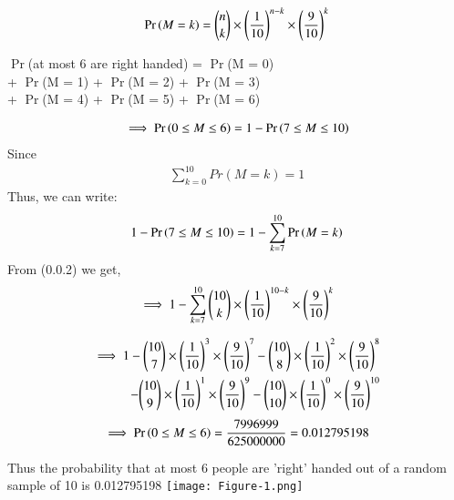 \documentclass[journal,12pt,twocolumn]{IEEEtran}
\begin{document}
\begin{align}
\Pr\left(M=k\right) = {{n}\choose{k}} \times \left(\frac{1}{10}\right)^{n-k} \times \left(\frac{9}{10}\right)^{k}\label{0.0.2}
\end{align}
\begin{center}
$\Pr$(at most 6 are right handed) = $\Pr$(M = 0)\\+ $\Pr$(M = 1) + $\Pr$(M = 2) + $\Pr$(M = 3) \\+ $\Pr$(M = 4) + $\Pr$(M = 5) + $\Pr$(M = 6)\\ 
\end{center}
\begin{align}
\implies \Pr\left(0\leq M \leq 6\right) = 1 - \Pr\left(7 \leq M \leq10\right)\label{0.0.3}
\end{align}
Since
\begin{align}
\sum_{k=0}^{10} Pr(M=k) = 1\label{0.0.4}
\end{align}
\bigskip
Thus, we can write:
\begin{align}
1 - \Pr\left(7 \leq M \leq 10\right) = 1 - \sum_{k=7}^{10} \Pr\left(M=k\right)\label{0.0.5}
\end{align}
From (0.0.2) we get,
\begin{align}
\implies 1 - \sum_{k=7}^{10} {{10}\choose{k}} \times \left(\frac{1}{10}\right)^{10-k} \times \left(\frac{9}{10}\right)^{k}\label{0.0.6}
\end{align}

\begin{align}
\begin{split}
\implies 1 - {{10}\choose{7}} \times \brak{\frac{1}{10}}^{3} \times \brak{\frac{9}{10}}^{7} - {{10}\choose{8}} \times \brak{\frac{1}{10}}^{2} \times \brak{\frac{9}{10}}^{8}
\bigskip\\
-{{10}\choose{9}} \times \brak{\frac{1}{10}}^{1} \times \brak{\frac{9}{10}}^{9} - {{10}\choose{10}} \times \brak{\frac{1}{10}}^{0}\times
\brak{\frac{9}{10}}^{10}\label{0.0.7}
\end{split}
\end{align}
\begin{align}
\implies \Pr\left(0 \leq M \leq 6\right) = \frac{7996999}{625000000} = 0.012795198\notag
\end{align}

\bigskip
Thus the probability that at most 6 people are 'right' handed out of a random sample of 10 is 0.012795198 
\pagebreak
\texttt{[image: Figure-1.png]}
\end{document}

